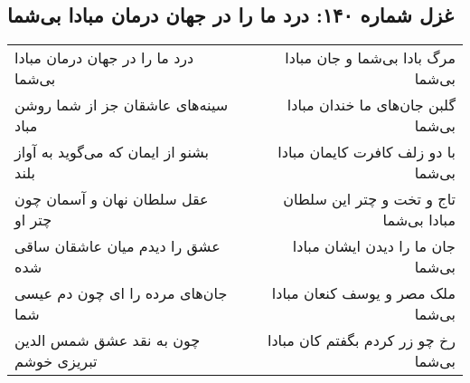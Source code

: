 \begin{center}
\section*{غزل شماره ۱۴۰: درد ما را در جهان درمان مبادا بی‌شما}
\label{sec:0140}
\begin{longtable}{l p{0.5cm} r}
درد ما را در جهان درمان مبادا بی‌شما
&&
مرگ بادا بی‌شما و جان مبادا بی‌شما
\\
سینه‌های عاشقان جز از شما روشن مباد
&&
گلبن جان‌های ما خندان مبادا بی‌شما
\\
بشنو از ایمان که می‌گوید به آواز بلند
&&
با دو زلف کافرت کایمان مبادا بی‌شما
\\
عقل سلطان نهان و آسمان چون چتر او
&&
تاج و تخت و چتر این سلطان مبادا بی‌شما
\\
عشق را دیدم میان عاشقان ساقی شده
&&
جان ما را دیدن ایشان مبادا بی‌شما
\\
جان‌های مرده را ای چون دم عیسی شما
&&
ملک مصر و یوسف کنعان مبادا بی‌شما
\\
چون به نقد عشق شمس الدین تبریزی خوشم
&&
رخ چو زر کردم بگفتم کان مبادا بی‌شما
\\
\end{longtable}
\end{center}
